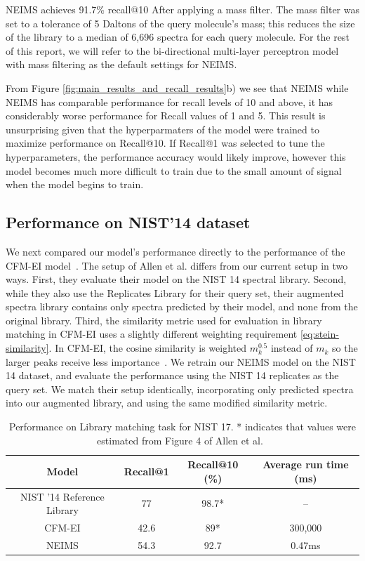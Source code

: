
NEIMS achieves 91.7\% recall@10 After applying a mass filter. The mass filter was set to a tolerance of 5 Daltons of the query molecule's mass; this reduces the size of the library to a median of 6,696 spectra for each query molecule. 
For the rest of this report, we will refer to the bi-directional multi-layer perceptron model with mass filtering as the default settings for NEIMS.

From Figure \ref{fig:main_results_and_recall_results}b) we see that NEIMS while NEIMS has comparable performance for recall levels of 10 and above, it has considerably worse performance for Recall values of 1 and 5. This result is unsurprising given that the hyperparmaters of the model were trained to maximize performance on Recall@10. If Recall@1 was selected to tune the hyperparameters, the performance accuracy would likely improve, however this model becomes much more difficult to train due to the small amount of signal when the model begins to train.

\subsection{Performance on NIST'14 dataset}
\label{sec:NIST14-results}

We next compared our model's performance directly to the performance of the CFM-EI model~\cite{allen2016computational}. The setup of Allen et al. differs from our current setup in two ways. First, they evaluate their model on the NIST 14 spectral library. Second, while they also use the Replicates Library for their query set, their augmented spectra library contains only spectra predicted by their model, and none from the original library. Third, the similarity metric used for evaluation in library matching in CFM-EI uses a slightly different weighting requirement \eqref{eq:stein-similarity}. In CFM-EI, the cosine similarity is weighted $m_k^{0.5}$ instead of $m_k$ so the larger peaks receive less importance~\cite{allen2016computational}.
We retrain our NEIMS model on the NIST 14 dataset, and evaluate the performance using the NIST 14 replicates as the query set. We match their setup identically, incorporating only predicted spectra into our augmented library, and using the same modified similarity metric.

\begin{table}[h]
    \centering
    \begin{tabular}{c|c|c|c}
        Model & Recall@1 & Recall@10 (\%) &  Average run time (ms) \\
        \hline
        NIST '14 Reference Library & 77 & 98.7* & -- \\
        CFM-EI & 42.6 & 89* &  300,000 \\
        NEIMS & 54.3 & 92.7 &  0.47ms
    \end{tabular}
    \caption{Performance on Library matching task for NIST 17. * indicates that values were estimated from  Figure 4 of Allen et al.~\cite{allen2016computational}}
    \label{tab:NIST14_results}
\end{table}

